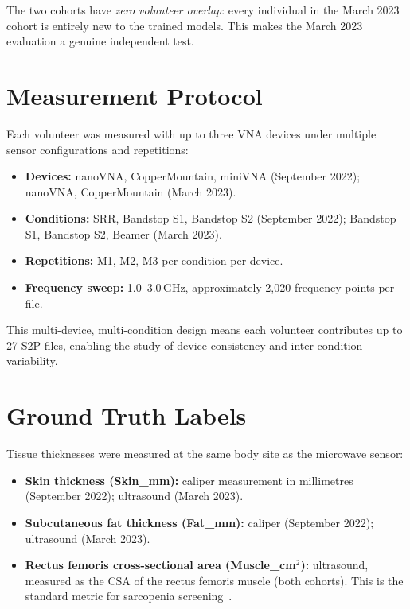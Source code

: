 \documentclass[12pt, a4paper, oneside]{report}
\begin{document}
The two cohorts have \emph{zero volunteer overlap}: every individual in the March 2023 cohort is entirely new to the trained models. This makes the March 2023 evaluation a genuine independent test.

\section{Measurement Protocol}

Each volunteer was measured with up to three VNA devices under multiple sensor configurations and repetitions:

\begin{itemize}[noitemsep]
  \item \textbf{Devices:} nanoVNA, CopperMountain, miniVNA (September 2022); nanoVNA, CopperMountain (March 2023).
  \item \textbf{Conditions:} SRR, Bandstop S1, Bandstop S2 (September 2022); Bandstop S1, Bandstop S2, Beamer (March 2023).
  \item \textbf{Repetitions:} M1, M2, M3 per condition per device.
  \item \textbf{Frequency sweep:} 1.0--3.0\,GHz, approximately 2,020 frequency points per file.
\end{itemize}

This multi-device, multi-condition design means each volunteer contributes up to 27 S2P files, enabling the study of device consistency and inter-condition variability.

\section{Ground Truth Labels}

Tissue thicknesses were measured at the same body site as the microwave sensor:

\begin{itemize}[noitemsep]
  \item \textbf{Skin thickness (Skin\_mm):} caliper measurement in millimetres (September 2022); ultrasound (March 2023).
  \item \textbf{Subcutaneous fat thickness (Fat\_mm):} caliper (September 2022); ultrasound (March 2023).
  \item \textbf{Rectus femoris cross-sectional area (Muscle\_cm$^2$):} ultrasound, measured as the CSA of the rectus femoris muscle (both cohorts). This is the standard metric for sarcopenia screening~\cite{mueller2014}.
\end{itemize}
\end{document}
